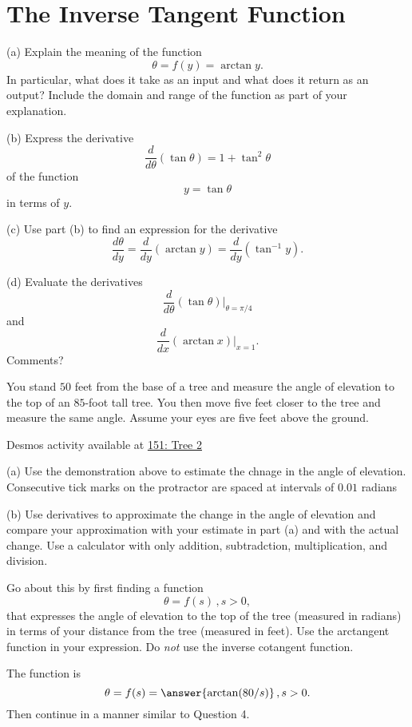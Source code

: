 \documentclass{ximera}
\begin{document}
\section*{The Inverse Tangent Function}
\begin{question}  \label{Q:KKDbret434}
(a) Explain the meaning of the function
\[
        \theta = f(y) = \arctan y .
\]
In particular, what does it take as an input and what does it return as an output? Include the domain and range of the function as part of your explanation.

(b) Express the derivative
\[
     \frac{d}{d\theta} \left( \tan\theta  \right) = 1 + \tan^2\theta
\]
of the function 
\[
    y = \tan\theta
\]
in terms of $y$.

(c) Use part (b) to find an expression for the derivative
\[
   \frac{d\theta}{dy} = \frac{d}{dy} \left(  \arctan y \right) =  \frac{d}{dy} \left(  \tan^{-1} y \right) .
\]

(d) Evaluate the derivatives
\[
   \frac{d}{d\theta} \left( \tan\theta  \right)\Big|_{\theta = \pi/4}
\]
and
\[
  \frac{d}{dx} \left(  \arctan x \right)\Big|_{x=1} . 
\]
Comments?
\end{question}

\begin{question}  \label{Q45544fhL}
You stand $50$ feet from the base of a tree and measure the angle of elevation to the top of an $85$-foot tall tree. You then move five feet closer to the tree and measure the same angle. Assume your eyes are five feet above the ground. 

\begin{onlineOnly}
    \begin{center}
\end{center}
\end{onlineOnly}

Desmos activity available at \href{https://www.desmos.com/calculator/cboknvfhnf}{151: Tree 2}


(a) Use the demonstration above to estimate the chnage in the angle of elevation. Consecutive tick marks on the protractor are spaced at intervals of $0.01$ radians

(b) Use derivatives to approximate the change in the angle of elevation and compare your approximation with your estimate in part (a) and with the actual change. Use a calculator with only addition, subtradction, multiplication, and division.

Go about this by first finding a function
\[
    \theta = f(s) \, , s>0 ,
\]
that expresses the angle of elevation to the top of the tree (measured in radians) in terms of your distance from the tree (measured in feet). Use the arctangent function in your expression. Do \emph{not} use the inverse cotangent function.

The function is 
\[
      \theta = f(s)  = \answer{\arctan(80/s)} \, , s>0 .
\]
Then continue in a manner similar to Question 4. 

\end{question}
\end{document}
